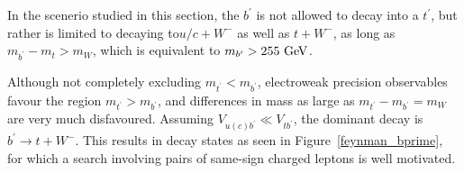 
In the scenerio studied in this section, the $b^\prime$ is not allowed to decay into a $t^\prime$, but rather is limited to decaying to$u/c+W^{-}$ as well as $t+W^{-}$, as long as $m_{b^\prime}-m_{t}> m_W$, which is equivalent to $m_{b^\prime} > 255 \GeV{}$.

Although not completely excluding $m_{t^\prime}<m_{b^\prime}$, electroweak precision observables favour the region $m_{t^\prime}>m_{b^\prime}$, and differences in mass as large as $m_{t^\prime}-m_{b^\prime}=m_{W}$ are very much disfavoured. 
Assuming $V_{u(c) b^\prime}\ll V_{t b^\prime}$, the dominant decay is $b^\prime \rightarrow t+ W^{-}$.
This results in decay states as seen in Figure~\ref{feynman_bprime}, for which a search involving pairs of same-sign charged leptons is well motivated.

